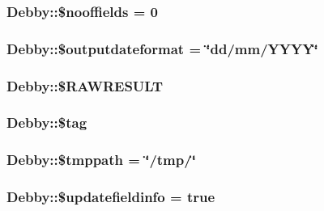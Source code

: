 \subsubsection[{\$nooffields}]{\setlength{\rightskip}{0pt plus 5cm}Debby\+::\$nooffields = 0}\label{classDebby_a72634c1e21e0f68c5a69e6a1db478ff5}
\hypertarget{classDebby_a708fea658eab39aad196703f8b8aaa18}{}
\subsubsection[{\$outputdateformat}]{\setlength{\rightskip}{0pt plus 5cm}Debby\+::\$outputdateformat = \char`\"{}dd/mm/Y\+Y\+Y\+Y\char`\"{}}\label{classDebby_a708fea658eab39aad196703f8b8aaa18}
\hypertarget{classDebby_a462ad03fefee05b5f763469f8bb5abfc}{}
\subsubsection[{\$\+R\+A\+W\+R\+E\+S\+U\+L\+T}]{\setlength{\rightskip}{0pt plus 5cm}Debby\+::\$\+R\+A\+W\+R\+E\+S\+U\+L\+T}\label{classDebby_a462ad03fefee05b5f763469f8bb5abfc}
\hypertarget{classDebby_aaa503bfd657eddafff230f0d49da7cb1}{}
\subsubsection[{\$tag}]{\setlength{\rightskip}{0pt plus 5cm}Debby\+::\$tag}\label{classDebby_aaa503bfd657eddafff230f0d49da7cb1}
\hypertarget{classDebby_afffc183cbae8307150a838bf3a053ca8}{}
\subsubsection[{\$tmppath}]{\setlength{\rightskip}{0pt plus 5cm}Debby\+::\$tmppath = \char`\"{}/tmp/\char`\"{}}\label{classDebby_afffc183cbae8307150a838bf3a053ca8}
\hypertarget{classDebby_a3e7f1fb2178543ff80e0ce7e7b85e528}{}
\subsubsection[{\$updatefieldinfo}]{\setlength{\rightskip}{0pt plus 5cm}Debby\+::\$updatefieldinfo = true}\label{classDebby_a3e7f1fb2178543ff80e0ce7e7b85e528}
\hypertarget{classDebby_a378b706b515617c9019b313136e4678c}{}
